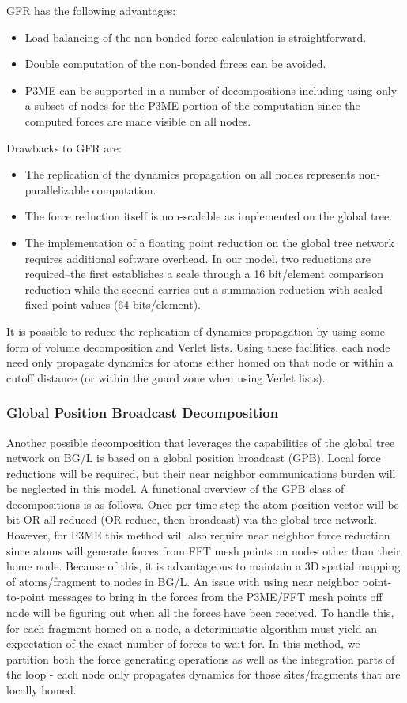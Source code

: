\documentclass[doublespacing]{elsart}
\begin{document}
GFR has the following advantages:
\begin{itemize}
\item Load balancing of the non-bonded force calculation is
  straightforward.
\item Double computation of the non-bonded forces can be avoided.
\item P3ME can be supported in a number of decompositions including
  using only a subset of nodes for the P3ME portion of the computation
  since the computed forces are made visible on all nodes.
\end{itemize}
Drawbacks to GFR are:
\begin{itemize}
\item The replication of the dynamics propagation on all nodes
  represents non-parallelizable computation.
\item The force reduction itself is non-scalable as implemented on the
  global tree.
\item The implementation of a floating point reduction on the global
  tree network requires additional software overhead.  In our model,
  two reductions are required--the first establishes a scale through a
  16 bit/element comparison reduction while the second carries out a
  summation reduction with scaled fixed point values (64 bits/element).
\end{itemize}

It is possible to reduce the replication of dynamics propagation by
using some form of volume decomposition and Verlet lists.  Using these
facilities, each node need only propagate dynamics for atoms either
homed on that node or within a cutoff distance (or within the guard
zone when using Verlet lists).

\subsubsection{Global Position Broadcast Decomposition\label{sect:gp}}

Another possible decomposition that leverages the capabilities of the
global tree network on BG/L is based on a global position broadcast
(GPB). Local force reductions will be required, but their near
neighbor communications burden will be neglected in this model.  A
functional overview of the GPB class of decompositions is as follows.
Once per time step the atom position vector will be bit-OR all-reduced
(OR reduce, then broadcast) via the global tree network.  However, for
P3ME this method will also require near neighbor force reduction since
atoms will generate forces from FFT mesh points on nodes other than
their home node.  Because of this, it is advantageous to maintain a 3D
spatial mapping of atoms/fragment to nodes in BG/L.  An issue with
using near neighbor point-to-point messages to bring in the forces
from the P3ME/FFT mesh points off node will be figuring out when all
the forces have been received.  To handle this, for each fragment
homed on a node, a deterministic algorithm must yield an expectation
of the exact number of forces to wait for.  In this method, we
partition both the force generating operations as well as the
integration parts of the loop - each node only propagates dynamics for
those sites/fragments that are locally homed.
\end{document}

